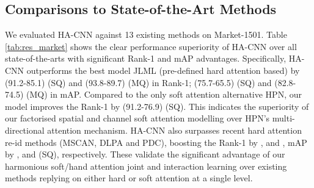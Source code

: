 \documentclass[10pt,twocolumn,letterpaper]{article}
\begin{document}
\subsection{Comparisons to State-of-the-Art Methods}
We evaluated HA-CNN against 13 existing methods on Market-1501.
Table \ref{tab:res_market} shows the clear performance superiority of HA-CNN
over all state-of-the-arts with significant Rank-1 and mAP advantages. 
Specifically, HA-CNN outperforms the  best model JLML (pre-defined hard attention based)
by  (91.2-85.1) (SQ) and  (93.8-89.7) (MQ) in Rank-1;  (75.7-65.5) (SQ) and  (82.8-74.5) (MQ) in mAP. 
Compared to the only soft attention alternative HPN,
our model improves the Rank-1 by  (91.2-76.9) (SQ).
This indicates the superiority of our factorised spatial and channel soft attention modelling
over HPN's multi-directional attention mechanism.
HA-CNN also surpasses recent hard attention re-id methods (MSCAN,  DLPA and PDC),
boosting the Rank-1 by ,  and ,
mAP by ,  and  (SQ), respectively. 
These validate the significant advantage of our harmonious soft/hand attention 
joint and interaction learning
over existing methods replying on either hard or soft attention at a single level. 
\vspace{-0.1cm}
\end{document}
